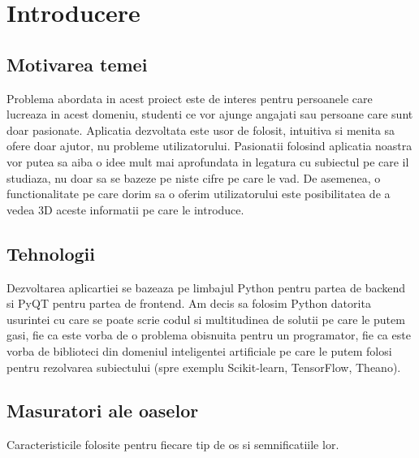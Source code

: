 \documentclass[runningheads,a4paper,11pt]{report}
\begin{document}

\chapter{Introducere}
\label{chapter:introducere}

\section{Motivarea temei}
\label{section:motivare}

Problema abordata in acest proiect este de interes pentru persoanele care lucreaza in acest domeniu, studenti ce vor ajunge angajati sau persoane care sunt doar pasionate. Aplicatia dezvoltata este usor de folosit, intuitiva si menita sa ofere doar ajutor, nu probleme utilizatorului. \newline \newline
Pasionatii folosind aplicatia noastra vor putea sa aiba o idee mult mai aprofundata in legatura cu subiectul pe care il studiaza, nu doar sa se bazeze pe niste cifre pe care le vad. De asemenea, o functionalitate pe care dorim sa o oferim utilizatorului este posibilitatea de a vedea 3D aceste informatii pe care le introduce. \newline

\section{Tehnologii}
\label{section:tehnologii}
Dezvoltarea aplicartiei se bazeaza pe limbajul Python pentru partea de backend si PyQT pentru partea de frontend. Am decis sa folosim Python datorita usurintei cu care se poate scrie codul si multitudinea de solutii pe care le putem gasi, fie ca este vorba de o problema obisnuita pentru un programator, fie ca este vorba de biblioteci din domeniul inteligentei artificiale pe care le putem folosi pentru rezolvarea subiectului (spre exemplu Scikit-learn, TensorFlow, Theano).

\section{Masuratori ale oaselor}
\label{section:masuratori}
Caracteristicile folosite pentru fiecare tip de os si semnificatiile lor.
\end{document}
